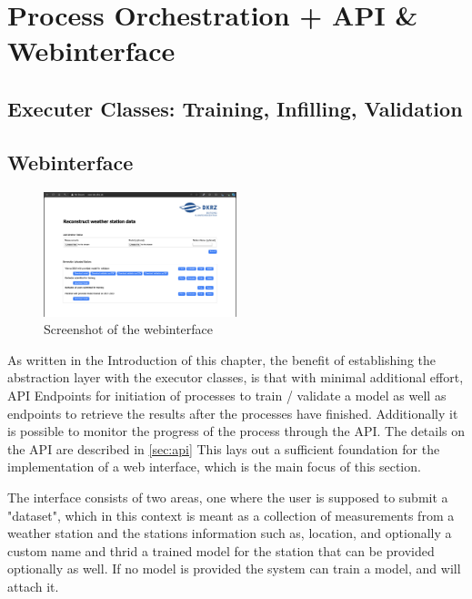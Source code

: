 
\section{Process Orchestration + API \& Webinterface}
\label{sec:process_orchestration}
\subsection{Executer Classes: Training, Infilling, Validation}


\subsection{Webinterface}

\begin{figure}
    \centering
    \includegraphics[width=0.5\textwidth]{resources/images/webinterface_screenshot.png}
    \caption{Screenshot of the webinterface}
    \label{fig:webinterface_screenshot}
\end{figure}

As written in the Introduction of this chapter, the benefit of establishing the abstraction layer with the executor classes, is that with minimal additional effort, API Endpoints for initiation of processes to train / validate a model as well as endpoints to retrieve the results after the processes have finished. Additionally it is possible to monitor the progress of the process through the API. The details on the API are described in \autoref{sec:api} This lays out a sufficient foundation for the implementation of a web interface, which is the main focus of this section.

The interface consists of two areas, one where the user is supposed to submit a "dataset", which in this context is meant as a collection of measurements from a weather station and the stations information such as, location, and optionally a custom name and thrid a trained model for the station that can be provided optionally as well. If no model is provided the system can train a model, and will attach it. 

